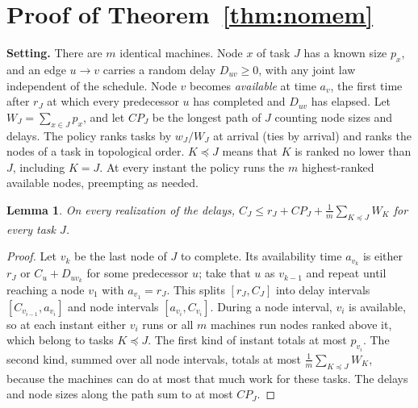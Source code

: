 \documentclass{article}
\newtheorem{lemma}{Lemma}
\begin{document}



\appendix

\section{Proof of Theorem~\ref{thm:nomem}}
\label{app:thm1}

\textbf{Setting.} There are $m$ identical machines. Node $x$ of task $J$ has a known size $p_x$, and an edge
$u \to v$ carries a random delay $D_{uv} \ge 0$, with any joint law independent of the schedule. Node $v$ becomes
\emph{available} at time $a_v$, the first time after $r_J$ at which every predecessor $u$ has completed and
$D_{uv}$ has elapsed. Let $W_J = \sum_{x \in J} p_x$, and let $CP_J$ be the longest path of $J$ counting node sizes
and delays. The policy ranks tasks by $w_J/W_J$ at arrival (ties by arrival) and ranks the nodes of a task in
topological order. $K \preceq J$ means that $K$ is ranked no lower than $J$, including $K = J$. At every instant the
policy runs the $m$ highest-ranked available nodes, preempting as needed.

\begin{lemma}
\label{lem:pathA}
On every realization of the delays, $C_J \le r_J + CP_J + \frac{1}{m}\sum_{K \preceq J} W_K$ for every task $J$.
\end{lemma}
\begin{proof}
Let $v_k$ be the last node of $J$ to complete. Its availability time $a_{v_k}$ is either $r_J$ or
$C_u + D_{u v_k}$ for some predecessor $u$; take that $u$ as $v_{k-1}$ and repeat until reaching a node $v_1$ with
$a_{v_1} = r_J$. This splits $[r_J, C_J]$ into delay intervals $[C_{v_{i-1}}, a_{v_i}]$ and node intervals
$[a_{v_i}, C_{v_i}]$. During a node interval, $v_i$ is available, so at each instant either $v_i$ runs or all $m$
machines run nodes ranked above it, which belong to tasks $K \preceq J$. The first kind of instant totals at most
$p_{v_i}$. The second kind, summed over all node intervals, totals at most $\frac{1}{m}\sum_{K \preceq J} W_K$,
because the machines can do at most that much work for these tasks. The delays and node sizes along the path sum
to at most $CP_J$.
\end{proof}
\end{document}
